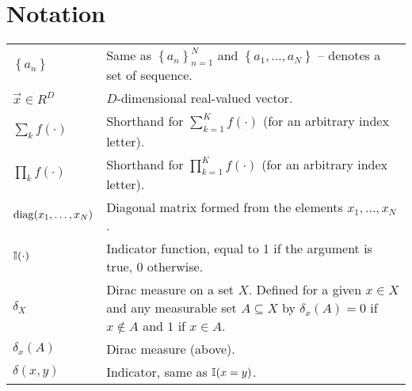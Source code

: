 \chapter{Notation}
\begin{table}[h]
\begin{tabulary}{1\textwidth}{lL}
    $\left\{a_n\right\}$                & Same as $\left\{a_n\right\}_{n = 1}^N$ and $\left\{a_1, \dotsc, a_N\right\}$ -- denotes a set of sequence. \\
    $\vec x \in R^D$                    & $D$-dimensional real-valued vector. \\
    $\sum_k f(\cdot)$                   & Shorthand for $\sum_{k = 1}^K f(\cdot)$ (for an arbitrary index letter). \\
    $\prod_k f(\cdot)$                  & Shorthand for $\prod_{k = 1}^K f(\cdot)$ (for an arbitrary index letter). \\
    $\operatorname{diag}(x_1, \dotsc, x_N)$           & Diagonal matrix formed from the elements $x_1, \dotsc, x_N$. \\
    $\operatorname{\mathbb I}(\cdot)$							& Indicator function, equal to 1 if the argument is true, 0 otherwise. \\
    $\delta_X$							& Dirac measure on a set $X$. Defined for a given $x \in X$ and any measurable set $A \subseteq X$ by $\delta_x(A) = 0$ if $x \notin A$ and $1$ if $x \in A$. \\
    $\delta_x(A)$						& Dirac measure (above). \\
    $\delta(x, y)$						& Indicator, same as $\operatorname{\mathbb I}(x = y)$.
\end{tabulary}
\end{table}